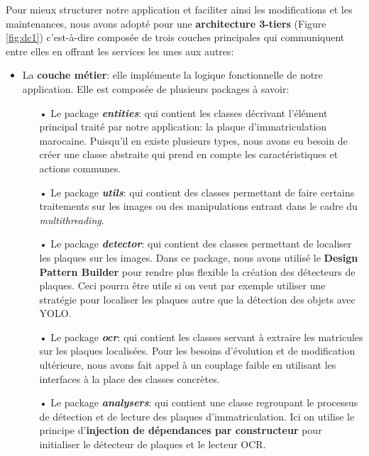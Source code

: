     
    Pour mieux structurer notre application et faciliter ainsi les modifications et les maintenances, nous avons adopté pour une \textbf{architecture 3-tiers} (Figure \ref{fig:dc1}) c’est-à-dire composée de trois couches principales qui communiquent entre elles en offrant les services les unes aux autres:
    \begin{itemize}
        \item La \textbf{couche métier}: elle implémente la logique fonctionnelle de notre application. Elle est composée de plusieurs packages à savoir:
            \begin{itemize}
                \item[•] Le package \textbf{\textit{entities}}: qui contient les classes décrivant l'élément principal traité par notre application: la plaque d'immatriculation marocaine. Puisqu'il en existe plusieurs types, nous avons eu besoin de créer une classe abstraite qui prend en compte les caractéristiques et actions communes.
                
                \item[•] Le package \textbf{\textit{utils}}: qui contient des classes permettant de faire certains traitements sur les images ou des manipulations entrant dans le cadre du \textit{multithreading}.
                
                \item[•] Le package \textbf{\textit{detector}}: qui contient des classes permettant de localiser les plaques sur les images. Dans ce package, nous avons utilisé le \textbf{Design Pattern Builder} pour rendre plus flexible la création des détecteurs de plaques. Ceci pourra être utile si on veut par exemple utiliser une stratégie pour localiser les plaques autre que la détection des objets avec YOLO.
                
                \item[•] Le package \textbf{\textit{ocr}}: qui contient les classes servant à extraire les matricules sur les plaques localisées. Pour les besoins d'évolution et de modification ultérieure, nous avons fait appel à un couplage faible en utilisant les interfaces à la place des classes concrètes.
                
                \item[•] Le package \textbf{\textit{analysers}}: qui contient une classe regroupant le processus de détection et de lecture des plaques d'immatriculation. Ici on utilise le principe d'\textbf{injection de dépendances par constructeur} pour initialiser le détecteur de plaques et le lecteur OCR.
                

\end{itemize}
\end{itemize}
